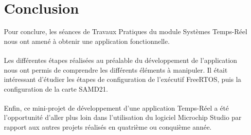 \section*{Conclusion}

\gap

\indent Pour conclure, les séances de Travaux Pratiques du module Systèmes Temps-Réel nous ont amené à obtenir une application fonctionnelle.
\\\\
\indent Les différentes étapes réalisées au préalable du développement de l'application nous ont permis de comprendre les différents éléments à manipuler.
Il était intéressant d'étudier les étapes de configuration de l'exécutif FreeRTOS, puis la configuration de la carte SAMD21.
\\\\
\indent Enfin, ce mini-projet de développement d'une application Temps-Réel a été l'opportunité d'aller plus loin dans l'utilisation du logiciel Microchip Studio par rapport aux autres projets réalisés en quatrième ou conquième année.